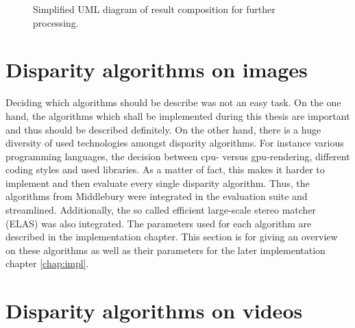 \begin{figure}[h!]
  \centering
  \caption{Simplified UML diagram of result composition for further processing.}
\end{figure}


\section{Disparity algorithms on images}

Deciding which algorithms should be describe was not an easy task.
On the one hand, the algorithms which shall be implemented during this thesis are important and thus should be described definitely.
On the other hand, there is a huge diversity of used technologies amongst disparity algorithms.
For instance various programming languages, the decision between cpu- versus gpu-rendering, different coding styles and used libraries.
As a matter of fact, this makes it harder to implement and then evaluate every single disparity algorithm.
Thus, the algorithms from Middlebury were integrated in the evaluation suite and streamlined.
Additionally, the so called efficient large-scale stereo matcher (ELAS) was also integrated.
The parameters used for each algorithm are described in the implementation chapter.
This section is for giving an overview on these algorithms as well as their parameters for the later implementation chapter \ref{chap:impl}.



\section{Disparity algorithms on videos}

